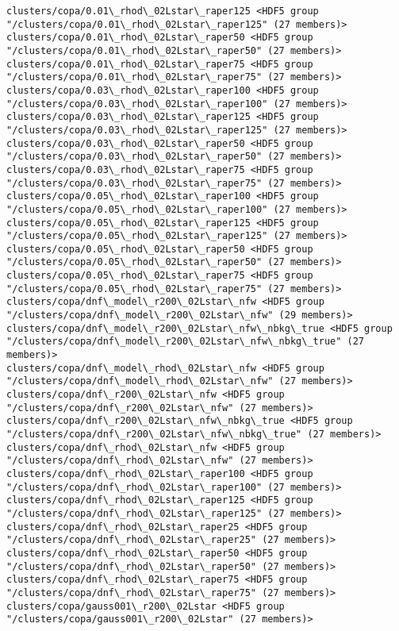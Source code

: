 \documentclass[11pt]{article}
\begin{document}
\begin{Verbatim}[commandchars=\\\{\}]
clusters/copa/0.01\_rhod\_02Lstar\_raper125 <HDF5 group "/clusters/copa/0.01\_rhod\_02Lstar\_raper125" (27 members)>
clusters/copa/0.01\_rhod\_02Lstar\_raper50 <HDF5 group "/clusters/copa/0.01\_rhod\_02Lstar\_raper50" (27 members)>
clusters/copa/0.01\_rhod\_02Lstar\_raper75 <HDF5 group "/clusters/copa/0.01\_rhod\_02Lstar\_raper75" (27 members)>
clusters/copa/0.03\_rhod\_02Lstar\_raper100 <HDF5 group "/clusters/copa/0.03\_rhod\_02Lstar\_raper100" (27 members)>
clusters/copa/0.03\_rhod\_02Lstar\_raper125 <HDF5 group "/clusters/copa/0.03\_rhod\_02Lstar\_raper125" (27 members)>
clusters/copa/0.03\_rhod\_02Lstar\_raper50 <HDF5 group "/clusters/copa/0.03\_rhod\_02Lstar\_raper50" (27 members)>
clusters/copa/0.03\_rhod\_02Lstar\_raper75 <HDF5 group "/clusters/copa/0.03\_rhod\_02Lstar\_raper75" (27 members)>
clusters/copa/0.05\_rhod\_02Lstar\_raper100 <HDF5 group "/clusters/copa/0.05\_rhod\_02Lstar\_raper100" (27 members)>
clusters/copa/0.05\_rhod\_02Lstar\_raper125 <HDF5 group "/clusters/copa/0.05\_rhod\_02Lstar\_raper125" (27 members)>
clusters/copa/0.05\_rhod\_02Lstar\_raper50 <HDF5 group "/clusters/copa/0.05\_rhod\_02Lstar\_raper50" (27 members)>
clusters/copa/0.05\_rhod\_02Lstar\_raper75 <HDF5 group "/clusters/copa/0.05\_rhod\_02Lstar\_raper75" (27 members)>
clusters/copa/dnf\_model\_r200\_02Lstar\_nfw <HDF5 group "/clusters/copa/dnf\_model\_r200\_02Lstar\_nfw" (29 members)>
clusters/copa/dnf\_model\_r200\_02Lstar\_nfw\_nbkg\_true <HDF5 group "/clusters/copa/dnf\_model\_r200\_02Lstar\_nfw\_nbkg\_true" (27 members)>
clusters/copa/dnf\_model\_rhod\_02Lstar\_nfw <HDF5 group "/clusters/copa/dnf\_model\_rhod\_02Lstar\_nfw" (27 members)>
clusters/copa/dnf\_r200\_02Lstar\_nfw <HDF5 group "/clusters/copa/dnf\_r200\_02Lstar\_nfw" (27 members)>
clusters/copa/dnf\_r200\_02Lstar\_nfw\_nbkg\_true <HDF5 group "/clusters/copa/dnf\_r200\_02Lstar\_nfw\_nbkg\_true" (27 members)>
clusters/copa/dnf\_rhod\_02Lstar\_nfw <HDF5 group "/clusters/copa/dnf\_rhod\_02Lstar\_nfw" (27 members)>
clusters/copa/dnf\_rhod\_02Lstar\_raper100 <HDF5 group "/clusters/copa/dnf\_rhod\_02Lstar\_raper100" (27 members)>
clusters/copa/dnf\_rhod\_02Lstar\_raper125 <HDF5 group "/clusters/copa/dnf\_rhod\_02Lstar\_raper125" (27 members)>
clusters/copa/dnf\_rhod\_02Lstar\_raper25 <HDF5 group "/clusters/copa/dnf\_rhod\_02Lstar\_raper25" (27 members)>
clusters/copa/dnf\_rhod\_02Lstar\_raper50 <HDF5 group "/clusters/copa/dnf\_rhod\_02Lstar\_raper50" (27 members)>
clusters/copa/dnf\_rhod\_02Lstar\_raper75 <HDF5 group "/clusters/copa/dnf\_rhod\_02Lstar\_raper75" (27 members)>
clusters/copa/gauss001\_r200\_02Lstar <HDF5 group "/clusters/copa/gauss001\_r200\_02Lstar" (27 members)>

\end{Verbatim}
\end{document}
